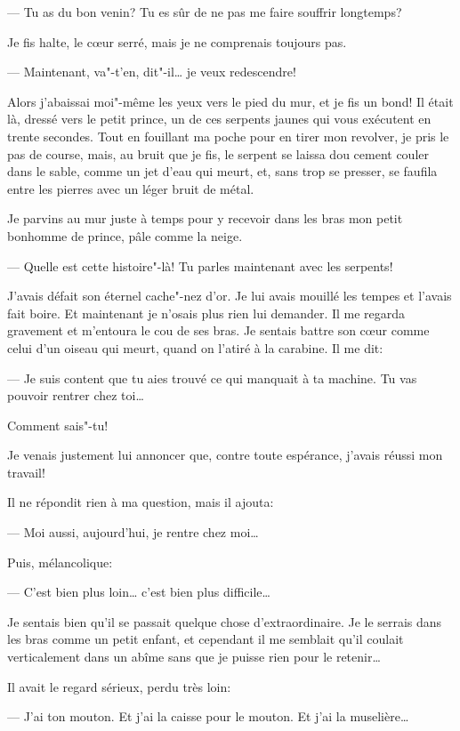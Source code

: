 \begin{Parallel}[p]{}{}
{--- Tu as du bon venin? Tu es sûr de ne pas me faire souffrir longtemps?

Je fis halte, le cœur serré, mais je ne comprenais toujours pas.

--- Maintenant, va"-t'en, dit"-il\ldots{} je veux redescendre!

Alors j'abaissai moi"-même les yeux vers le pied du mur, et je fis un bond!
Il était là, dressé vers le petit prince, un de ces serpents jaunes qui vous
exécutent en trente secondes. Tout en fouillant ma poche pour en tirer mon
revolver, je pris le pas de course, mais, au bruit que je fis, le serpent se
laissa dou cement couler dans le sable, comme un jet d'eau qui meurt, et,
sans trop se presser, se faufila entre les pierres avec un léger bruit de
métal.

Je parvins au mur juste à temps pour y recevoir dans les bras mon petit
bonhomme de prince, pâle comme la neige.

--- Quelle est cette histoire"-là! Tu parles maintenant avec les serpents!

J'avais défait son éternel cache"-nez d'or. Je lui avais mouillé les tempes
et l'avais fait boire. Et maintenant je n'osais plus rien lui demander. Il
me regarda gravement et m'entoura le cou de ses bras. Je sentais battre son
cœur comme celui d'un oiseau qui meurt, quand on l'atiré à la carabine. Il
me dit:

--- Je suis content que tu aies trouvé ce qui manquait à ta machine. Tu vas
pouvoir rentrer chez toi\ldots{}

Comment sais"-tu!

Je venais justement lui annoncer que, contre toute espérance, j'avais réussi
mon travail!

Il ne répondit rien à ma question, mais il ajouta:

--- Moi aussi, aujourd'hui, je rentre chez moi\ldots{}

Puis, mélancolique:

--- C'est bien plus loin\ldots{} c'est bien plus difficile\ldots{}

Je sentais bien qu'il se passait quelque chose d'extraordinaire. Je le serrais
dans les bras comme un petit enfant, et cependant il me semblait qu'il coulait
verticalement dans un abîme sans que je puisse rien pour le retenir\ldots{}

Il avait le regard sérieux, perdu très loin:

--- J'ai ton mouton. Et j'ai la caisse pour le mouton. Et j'ai la muselière\ldots{}

}
\end{Parallel}
